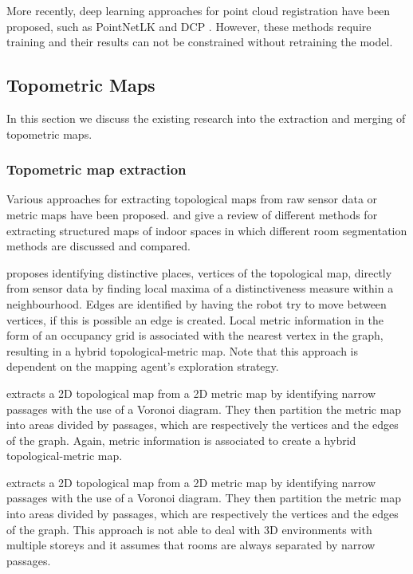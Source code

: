 More recently, deep learning approaches for point cloud registration have been proposed, such as PointNetLK and DCP \citep{aoki_pointnetlk_2019,wang_deep_2019}. However, these methods require training and their results can not be constrained without retraining the model.

\pagebreak

\subsection{Topometric Maps}
In this section we discuss the existing research into the extraction and merging of topometric maps.

\subsubsection{Topometric map extraction}
Various approaches for extracting topological maps from raw sensor data or metric maps have been proposed. \citet{bormann_room_2016} and \citet{pintore_state---art_2020} give a review of different methods for extracting structured maps of indoor spaces in which different room segmentation methods are discussed and compared.

\citet{kuipers_robot_1991} proposes identifying distinctive places, vertices of the topological map, directly from sensor data by finding local maxima of a distinctiveness measure within a neighbourhood. Edges are identified by having the robot try to move between vertices, if this is possible an edge is created. Local metric information in the form of an occupancy grid is associated with the nearest vertex in the graph, resulting in a hybrid topological-metric map. Note that this approach is dependent on the mapping agent's exploration strategy. 

\citet{thrun_learning_1998} extracts a 2D topological map from a 2D metric map by identifying narrow passages with the use of a Voronoi diagram. They then partition the metric map into areas divided by passages, which are respectively the vertices and the edges of the graph. Again, metric information is associated to create a hybrid topological-metric map. 

\citet{thrun_learning_1998} extracts a 2D topological map from a 2D metric map by identifying narrow passages with the use of a Voronoi diagram. They then partition the metric map into areas divided by passages, which are respectively the vertices and the edges of the graph. This approach is not able to deal with 3D environments with multiple storeys and it assumes that rooms are always separated by narrow passages.

